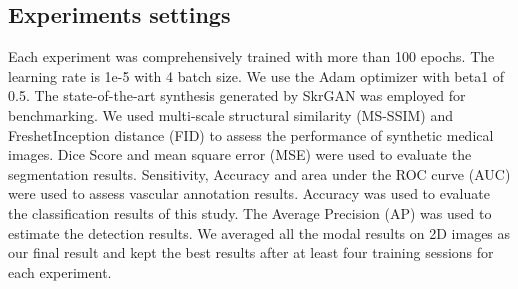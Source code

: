 \documentclass[runningheads]{llncs}
\begin{document}
	\subsection{Experiments settings}
	Each experiment was comprehensively trained with more than 100 epochs. The learning rate is 1e-5 with 4 batch size. We use the Adam optimizer with beta1 of 0.5.
	The state-of-the-art synthesis generated by SkrGAN\cite{96zhang2019skrgan:} was employed for benchmarking. We used multi-scale structural similarity (MS-SSIM) and FreshetInception distance (FID)\cite{148karras2017progressive} to assess the performance of synthetic medical images. Dice Score\cite {95dice1945measures} and mean square error (MSE) were used to evaluate the segmentation results. Sensitivity, Accuracy and area under the ROC curve (AUC) were used to assess vascular annotation results. Accuracy was used to evaluate the classification results of this study. The Average Precision (AP) was used to estimate the detection results. We averaged all the modal results on 2D images as our final result and kept the best results after at least four training sessions for each experiment.
	
\end{document}
